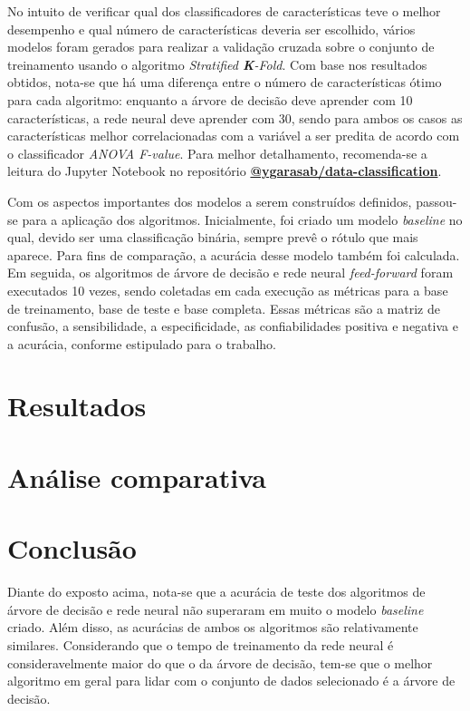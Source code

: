 \documentclass[12pt]{article}
\begin{document}
No intuito de verificar qual dos classificadores de características teve o melhor desempenho e qual número de características deveria ser escolhido, vários modelos foram gerados para realizar a validação cruzada sobre o conjunto de treinamento usando o algoritmo \textit{Stratified \textbf{K}-Fold}. Com base nos resultados obtidos, nota-se que há uma diferença entre o número de características ótimo para cada algoritmo: enquanto a árvore de decisão deve aprender com 10 características, a rede neural deve aprender com 30, sendo para ambos os casos as características melhor correlacionadas com a variável a ser predita de acordo com o classificador \textit{ANOVA F-value}. Para melhor detalhamento, recomenda-se a leitura do Jupyter Notebook no repositório \textbf{\href{https://github.com/ygarasab/data-classification}{@ygarasab/data-classification}}.

Com os aspectos importantes dos modelos a serem construídos definidos, passou-se para a aplicação dos algoritmos. Inicialmente, foi criado um modelo \textit{baseline} no qual, devido ser uma classificação binária, sempre prevê o rótulo que mais aparece. Para fins de comparação, a acurácia desse modelo também foi calculada. Em seguida, os algoritmos de árvore de decisão e rede neural \textit{feed-forward} foram executados 10 vezes, sendo coletadas em cada execução as métricas para a base de treinamento, base de teste e base completa. Essas métricas são a matriz de confusão, a sensibilidade, a especificidade, as confiabilidades positiva e negativa e a acurácia, conforme estipulado para o trabalho. 
	
\section{Resultados}\label{sec:resultados}

\section{Análise comparativa}\label{sec:analise}

\section{Conclusão}\label{sec:conclusao}
Diante do exposto acima, nota-se que a acurácia de teste dos algoritmos de árvore de decisão e rede neural não superaram em muito o modelo \textit{baseline} criado. Além disso, as acurácias de ambos os algoritmos são relativamente similares.  Considerando que o tempo de treinamento da rede neural é consideravelmente maior do que o da árvore de decisão, tem-se que o melhor algoritmo em geral para lidar com o conjunto de dados selecionado é a árvore de decisão. 
\end{document}
